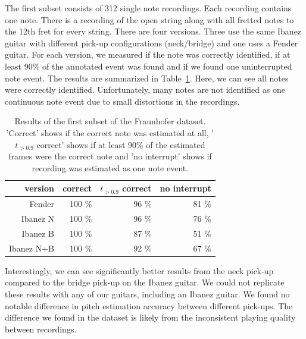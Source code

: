 \documentclass[a4paper,10pt,twocolumn]{article}
\begin{document}
The first subset consists of 312 single note recordings. Each recording contains one note. There is a recording of the open string along with all fretted notes to the 12th fret for every string. There are four versions. Three use the same Ibanez guitar with different pick-up configurations (neck/bridge) and one uses a Fender guitar. For each version, we measured if the note was correctly identified, if at least 90\% of the annotated event was found and if we found one uninterrupted note event. The results are summarized in Table~\ref{tab:expacc}. Here, we can see all notes were correctly identified. Unfortunately, many notes are not identified as one continuous note event due to small distortions in the recordings.
\begin{table}[b]
    \centering
    \begin{tabular}{r|rrr}
        version     & correct & $t_{>0.9}$ correct & no interrupt \\
        \hline
        Fender      & 100 \%  & 96 \%   & 81 \% \\
        Ibanez N    & 100 \%  & 96 \%   & 76 \% \\
        Ibanez B    & 100 \%  & 87 \%   & 51 \% \\
        Ibanez N+B  & 100 \%  & 92 \%   & 67 \%
    \end{tabular}
    \caption{Results of the first subset of the Fraunhofer dataset. 'Correct' shows if the correct note was estimated at all, '$t_{>0.9}$ correct' shows if at least 90\% of the estimated frames were the correct note and 'no interrupt' shows if recording was estimated as one note event.}
    \label{tab:expacc}
\end{table}

Interestingly, we can see significantly better results from the neck pick-up compared to the bridge pick-up on the Ibanez guitar. We could not replicate these results with any of our guitars, including an Ibanez guitar. We found no notable difference in pitch estimation accuracy between different pick-ups. The difference we found in the dataset is likely from the inconsistent playing quality between recordings.
\end{document}

